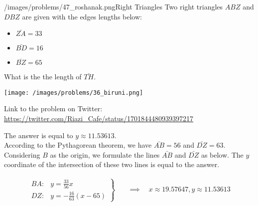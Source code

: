 \begin{problem}{/images/problems/47_roshanak.png}{Right Triangles}
    Two right triangles $ABZ$ and $DBZ$ are given with the edges lengths below: 

\begin{itemize}
\item $\bar{ZA}=33$

\item $\bar{BD} =16$

\item $\bar{BZ}=65$
\end{itemize}
What is the the length of $\bar{TH}$.

\begin{center}
\texttt{[image: /images/problems/36\_biruni.png]}
\end{center}

Link to the problem on Twitter:  \url{https://twitter.com/Riazi_Cafe/status/1701844480939397217}
\end{problem}
\begin{solution}
The answer is equal to $y \approx 11.53613$.\\[0.2cm]
According to the Pythagorean theorem, we have $\bar{AB}=56$ and $\bar{DZ}=63$. Considering $B$ as the origin, we formulate the lines $\bar{AB}$ and $\bar{DZ}$ as below. The $y$ coordinate of the intersection of these two lines is equal to the answer. %

$$\begin{align}
\left.
\begin{aligned}
BA:& y = \frac{33}{56} x \\
DZ:& y = -\frac{16}{63}(x - 65)
\end{aligned}
\right\}
\quad &\implies \quad
x \approx 19.57647, y \approx 11.53613
\end{align}$$

\end{solution}